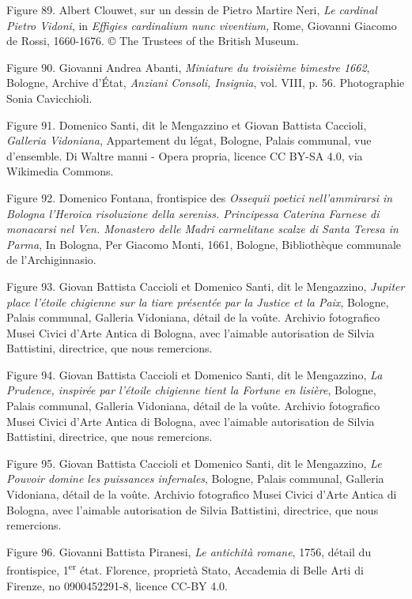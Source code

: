 \documentclass[12pt,twoside,openany]{book}
\begin{document}
Figure 89. Albert Clouwet, sur un dessin de Pietro Martire Neri, \textit{Le cardinal Pietro Vidoni}, in \textit{Effigies cardinalium nunc viventium, }Rome, Giovanni Giacomo de Rossi, 1660-1676. © The Trustees of the British Museum.

Figure 90. Giovanni Andrea Abanti, \textit{Miniature du troisième bimestre 1662}, Bologne, Archive d’État, \textit{Anziani Consoli, Insignia}, vol. VIII, p. 56. Photographie Sonia Cavicchioli.

Figure 91. Domenico Santi, dit le Mengazzino et Giovan Battista Caccioli, \textit{Galleria Vidoniana}, Appartement du légat, Bologne, Palais communal, vue d’ensemble. Di Waltre manni - Opera propria, licence CC BY-SA 4.0, via Wikimedia Commons.

Figure 92. Domenico Fontana, frontispice des \textit{Ossequii poetici nell’ammirarsi in Bologna l’Heroica risoluzione della sereniss. Principessa Caterina Farnese di monacarsi nel Ven. Monastero delle Madri carmelitane scalze di Santa Teresa in Parma}, In Bologna, Per Giacomo Monti, 1661, Bologne, Bibliothèque communale de l’Archiginnasio.

Figure 93. Giovan Battista Caccioli et Domenico Santi, dit le Mengazzino, \textit{Jupiter place l’étoile chigienne sur la tiare présentée par la Justice et la Paix}, Bologne, Palais communal, Galleria Vidoniana, détail de la voûte. Archivio fotografico Musei Civici d’Arte Antica di Bologna, avec l'aimable autorisation de Silvia Battistini, directrice, que nous remercions.

Figure 94. Giovan Battista Caccioli et Domenico Santi, dit le Mengazzino, \textit{La Prudence, inspirée par l’étoile chigienne tient la Fortune en lisière}, Bologne, Palais communal, Galleria Vidoniana, détail de la voûte. Archivio fotografico Musei Civici d’Arte Antica di Bologna, avec l'aimable autorisation de Silvia Battistini, directrice, que nous remercions.

Figure 95. Giovan Battista Caccioli et Domenico Santi, dit le Mengazzino, \textit{Le Pouvoir domine les puissances infernales}, Bologne, Palais communal, Galleria Vidoniana, détail de la voûte. Archivio fotografico Musei Civici d’Arte Antica di Bologna, avec l'aimable autorisation de Silvia Battistini, directrice, que nous remercions.

Figure 96. Giovanni Battista Piranesi, \textit{Le antichità romane}, 1756, détail du frontispice, 1\textsuperscript{er} état. Florence, proprietà Stato, Accademia di Belle Arti di Firenze, no 0900452291-8, licence CC-BY 4.0.
\end{document}
